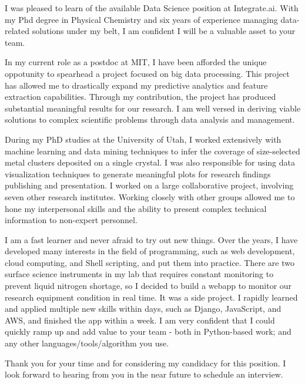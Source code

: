 \documentclass[11pt, letterpaper]{awesome-cv}
\begin{document}
\begin{cvletter}



I was pleased to learn of the available Data Science position at Integrate.ai.
With my Phd degree in Physical Chemistry and six years of experience managing
data-related solutions under my belt, I am confident I will be a valuable asset
to your team.



In my current role as a postdoc at MIT, I have been afforded the unique
oppotunity to spearhead a project focused on big data processing. This project
has allowed me to drastically expand my predictive analytics and feature
extraction capabilities. Through my contribution, the project has produced
substantial meaningful results for our research. I am well versed in deriving
viable solutions to complex scientific problems through data analysis and
management.

During my PhD studies at the University of Utah, I worked extensively with
machine learning and data mining techniques to infer the coverage of
size-selected metal clusters deposited on a single crystal. I was also
responsible for using data visualization techniques to generate meaningful plots
for research findings publishing and presentation. I worked on a large
collaborative project, involving seven other research institutes. Working
closely with other groups allowed me to hone my interpersonal skills
and the ability to present complex technical information to non-expert personnel.

I am a fast learner and never afraid to try out new things. Over the years, I
have developed many interests in the field of programming, such as web
development, cloud computing, and Shell scripting, and put them into practice.
There are two surface science instruments in my lab that requires constant
monitoring to prevent liquid nitrogen shortage, so I decided to build a webapp
to monitor our research equipment condition in real time. It was a side
project. I rapidly learned and applied multiple new skills within days,
such as Django, JavaScript, and AWS, and finished the app within a week. I am
very confident that I could quickly ramp up and add value to your team - both
in Python-based work; and any other languages/tools/algorithm you use.

Thank you for your time and for considering my candidacy for this position. I
look forward to hearing from you in the near future to schedule an interview.


\end{cvletter}


\makeletterclosing
\end{document}
